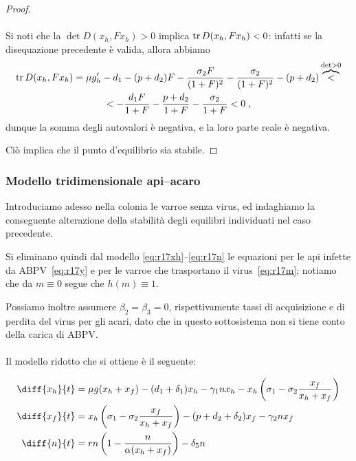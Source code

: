 \begin{proof}
\paragraph{}
Si noti che la $\det D(x_h, F x_h) > 0$ implica $\operatorname{tr} D(x_h, F x_h) <0$: infatti se la disequazione
precedente è valida, allora abbiamo
\begin{multline*}
\operatorname{tr} D(x_h, F x_h) = \mu g_h' -d_1 -(p+d_2)F - \frac{\sigma_2 F}{(1+F)^2} - \frac{\sigma_2}{(1+F)^2} - (p + d_2) \overbrace{<}^{\det >0} \\
< - \frac{d_1 F}{1+F} - \frac{p +d_2}{1+F} - \frac{\sigma_2}{1+F} < 0 \; ,
\end{multline*}
dunque la somma degli autovalori è negativa, e la loro parte reale è negativa.

Ciò implica che il punto d'equilibrio sia stabile.
\end{proof}


\subsubsection{Modello tridimensionale api--acaro}
Introduciamo adesso nella colonia le varroe senza virus, ed indaghiamo la conseguente alterazione della stabilità degli equilibri individuati nel caso precedente.

Si eliminano quindi dal modello \eqref{eq:r17xh}--\eqref{eq:r17n} le equazioni per le api infette
da ABPV~\eqref{eq:r17y} e per le varroe che trasportano il virus~\eqref{eq:r17m};
notiamo che da $m \equiv 0$ segue che $h(m) \equiv 1$.

Possiamo inoltre assumere $\beta_2 = \beta_3 = 0$, rispettivamente tassi di acquisizione e di perdita
del virus per gli acari, dato che in questo sottosistema non si tiene conto della carica di ABPV.

\paragraph{}
Il modello ridotto che si ottiene è il seguente:

\begin{align}
    \diff{x_h}{t} &= \mu g( x_h + x_f ) - (d_1 + \delta_1) x_h - \gamma_1 n x_h
        - x_h \left( \sigma_1 - \sigma_2 \frac{x_f}{x_h + x_f} \right)
        \label{eq:rattiRidotto2prima}
    \\
    \diff{x_f}{t} &= x_h \left( \sigma_1 - \sigma_2 \frac{x_f}{x_h + x_f} \right) - (p + d_2 + \delta_2) x_f
        - \gamma_2 n x_f
        \label{eq:rattiRidotto2seconda}
    \\
    \diff{n}{t} &= rn \left( 1 - \frac{n}{ \alpha (x_h + x_f) } \right) - \delta_5 n
        \label{eq:rattiRidotto2terza}
\end{align}

